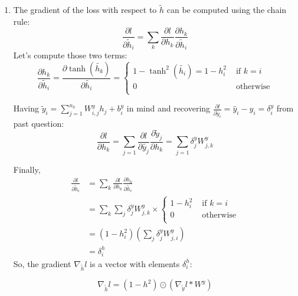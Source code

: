 \begin{enumerate}
    \item The gradient of the loss with respect to \( \tilde{h} \) can be computed using the chain rule:
          \[
              \frac{\partial l}{\partial \tilde{h}_i} = \sum_{k}^{} \frac{\partial l}{\partial h_k} \frac{\partial h_k}{\partial \tilde{h}_i}
          \]
          Let's compute those two terms:
          \[
              \frac{\partial h_k}{\partial \tilde{h}_i} = \frac{\partial \tanh (\tilde{h_k})}{\partial \tilde{h_i}} = \begin{cases}
                  1 - \tanh^2 (\tilde{h_i}) = 1 - h_i^2 & \text{ if } k = i \\
                  0                                     & \text{ otherwise} \\
              \end{cases}
          \]

          Having $ \tilde{y}_i = \sum_{j=1}^{n_h} W_{i,j}^y h_j +b_i^y$ in mind and recovering $ \frac{\partial l}{\partial \tilde{y}_i} = \hat{y}_i - y_i = \delta ^y_i $ from past question:
          \[
              \frac{\partial l}{\partial h_k} = \sum_{j=1}^{} \frac{\partial l}{\partial \tilde{y_j}} \frac{\partial \tilde{y}_j}{\partial h_k} = \sum_{j=1}^{} \delta ^y_j W^y_{j,k}
          \]

          Finally,
          \begin{align*}
              \frac{\partial l}{\partial \tilde{h}_i} & = \sum_{k}^{} \frac{\partial l}{\partial h_k} \frac{\partial h_k}{\partial \tilde{h}_i} \\
                                                      & = \sum_{k}^{} \sum_{j}^{} \delta ^y_j W^y_{j,k} \times \begin{cases}
                  1 - h_i^2 & \text{ if } k = i \\
                  0         & \text{ otherwise} \\
              \end{cases}       \\
                                                      & = (1 - h_i^2) \left(\sum_{j}^{} \delta ^y_j W^y_{j,i}\right)                            \\
                                                      & = \delta ^h _i
          \end{align*}
          So, the gradient \( \nabla _{\tilde{h}} l \) is a vector with elements $ \delta ^h _i $:

          \[
              \nabla _{\tilde{h}} l = (1 - h^2) \odot (\nabla _{\tilde{y}} l * W^y)
          \]



\end{enumerate}
